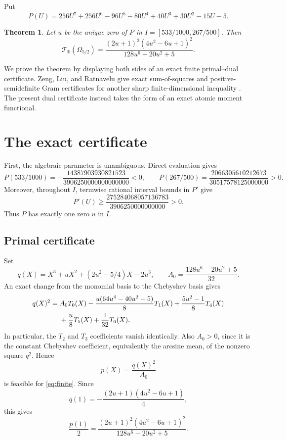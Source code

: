 \documentclass[11pt]{article}
\newtheorem{theorem}{Theorem}
\newcommand{\TR}{\mathcal T_{\mathbb R}}
\begin{document}
Put
\begin{equation}\label{eq:P}
 P(U)=256U^7+256U^6-96U^5-80U^4+40U^3+30U^2-15U-5.
\end{equation}

\begin{theorem}\label{thm:main}
Let $u$ be the unique zero of $P$ in
$I=[533/1000,267/500]$.  Then
\begin{equation}\label{eq:value}
 \TR(\Omega_{5/2})
 =\frac{(2u+1)^2(4u^2-6u+1)^2}
 {128u^6-20u^2+5}.
\end{equation}
\end{theorem}

We prove the theorem by displaying both sides of an exact finite
primal--dual certificate.  Zeng, Liu, and Ratnavelu give exact
sum-of-squares and positive-semidefinite Gram certificates for another sharp
finite-dimensional inequality \cite{ZengLiuRatnavelu2026}.  The present dual
certificate instead takes the form of an exact atomic moment functional.

\section{The exact certificate}

First, the algebraic parameter is unambiguous.  Direct evaluation gives
\[
 P(533/1000)=-\frac{14387903930821523}{3906250000000000000}<0,
 \qquad
 P(267/500)=\frac{2066305610212673}{30517578125000000}>0.
\]
Moreover, throughout $I$, termwise rational interval bounds in $P'$ give
\[
 P'(U)\geq
 \frac{275284068057136783}{3906250000000000}>0.
\]
Thus $P$ has exactly one zero $u$ in $I$.

\subsection{Primal certificate}

Set
\begin{equation}\label{eq:qA}
 q(X)=X^3+uX^2+(2u^2-5/4)X-2u^3,
 \qquad A_0=\frac{128u^6-20u^2+5}{32}.
\end{equation}
An exact change from the monomial basis to the Chebyshev basis gives
\begin{align}\label{eq:cheb-square}
q(X)^2={}&A_0T_0(X)
-\frac{u(64u^4-40u^2+5)}8T_1(X)
+\frac{5u^2-1}{8}T_4(X)\notag\\
&+\frac u8T_5(X)+\frac1{32}T_6(X).
\end{align}
In particular, the $T_2$ and $T_3$ coefficients vanish identically.
Also $A_0>0$, since it is the constant Chebyshev coefficient, equivalently
the arcsine mean, of the nonzero square $q^2$.  Hence
\begin{equation}\label{eq:primal}
 p(X)=\frac{q(X)^2}{A_0}
\end{equation}
is feasible for \eqref{eq:finite}.  Since
\[
 q(1)=-\frac{(2u+1)(4u^2-6u+1)}4,
\]
this gives
\begin{equation}\label{eq:primal-value}
 \frac{p(1)}2=
 \frac{(2u+1)^2(4u^2-6u+1)^2}{128u^6-20u^2+5}.
\end{equation}
\end{document}
